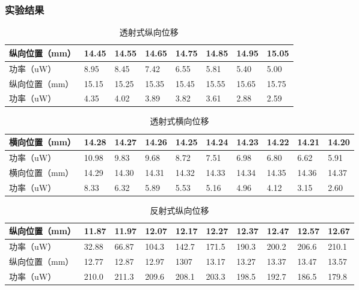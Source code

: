 \documentclass[UTF8]{ctexart}
\begin{document}
\subsubsection{实验结果}

\begin{table}[!h]
    \centering
    \begin{tabular}{|l|l|l|l|l|l|l|l|}
    \hline
    纵向位置（mm） & 14.45 & 14.55 & 14.65 & 14.75 & 14.85 & 14.95 & 15.05 \\ \hline
    功率（uW）   & 8.95  & 8.45  & 7.42  & 6.55  & 5.81  & 5.40  & 5.00  \\ \hline
    纵向位置（mm） & 15.15 & 15.25 & 15.35 & 15.45 & 15.55 & 15.65 & 15.75 \\ \hline
    功率（uW）   & 4.35  & 4.02  & 3.89  & 3.82  & 3.61  & 2.88  & 2.59  \\ \hline
    \end{tabular}
    \caption{透射式纵向位移}
    \label{tab:my_label}
\end{table}

\vspace{1em}

\begin{table}[!h]
    \centering
    \begin{tabular}{|l|l|l|l|l|l|l|l|l|l|}
    \hline
    横向位置（mm） & 14.28 & 14.27 & 14.26 & 14.25 & 14.24 & 14.23 & 14.22 & 14.21 & 14.20 \\ \hline
    功率（uW）   & 10.98 & 9.83  & 9.68  & 8.72  & 7.51  & 6.98  & 6.80  & 6.62  & 5.91  \\ \hline
    横向位置（mm） & 14.29 & 14.30 & 14.31 & 14.32 & 14.33 & 14.34 & 14.35 & 14.36 & 14.37 \\ \hline
    功率（uW）   & 8.33  & 6.32  & 5.89  & 5.53  & 5.16  & 4.96  & 4.12  & 3.15  & 2.60  \\ \hline
    \end{tabular}
    \caption{透射式横向位移}
\end{table}

\vspace{1em}

\begin{table}[!h]
    \centering
    \begin{tabular}{|l|l|l|l|l|l|l|l|l|l|}
    \hline
    纵向位置（mm） & 11.87 & 11.97 & 12.07 & 12.17 & 12.27 & 12.37 & 12.47 & 12.57 & 12.67 \\ \hline
    功率（uW）   & 32.88 & 66.87 & 104.3 & 142.7 & 171.5 & 190.3 & 200.2 & 206.6 & 210.1 \\ \hline
    纵向位置（mm） & 12.77 & 12.87 & 12.97 & 1307  & 13.17 & 13.27 & 13.37 & 13.47 & 13.57 \\ \hline
    功率（uW）   & 210.0 & 211.3 & 209.6 & 208.1 & 203.3 & 198.5 & 192.7 & 186.5 & 179.8 \\ \hline
    \end{tabular}
    \caption{反射式纵向位移}
\end{table}
\end{document}
